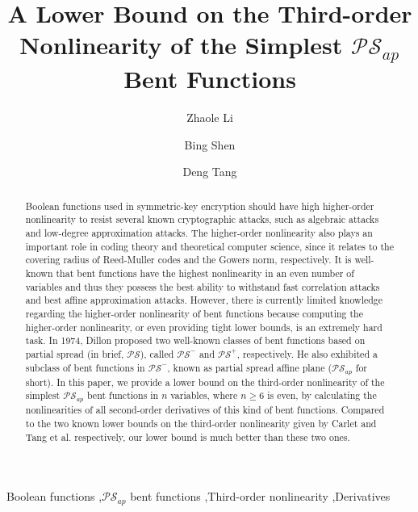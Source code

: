 \documentclass[preprint,10pt]{elsarticle}
\newcommand{\0}{\textbf{0}}
\newcommand{\1}{\textbf{1}}
\theoremstyle{plain}
\begin{document}
\begin{frontmatter}
\title{A Lower Bound on the Third-order Nonlinearity of the Simplest $\mathcal{PS}_{ap}$ Bent Functions}
\author[1]{Zhaole Li}

\author[2]{Bing Shen}

\author[1,2]{Deng Tang}

\begin{abstract}
Boolean functions used in symmetric-key encryption should have high higher-order nonlinearity to resist several known cryptographic attacks,
such as algebraic attacks and low-degree approximation attacks.
The higher-order nonlinearity also plays an important role in coding theory and theoretical computer science, since it relates to the covering radius of Reed-Muller codes and the Gowers norm, respectively.
It is well-known that bent functions have the highest nonlinearity in an even number of variables and thus they possess
the best ability to withstand fast correlation attacks and best affine approximation attacks.
However, there is currently limited knowledge regarding the higher-order nonlinearity of bent functions
because computing the higher-order nonlinearity, or even providing tight lower bounds, is an extremely hard task.
In 1974, Dillon proposed two well-known classes of bent functions based on partial spread (in brief, $\mathcal{PS}$), called
$\mathcal{PS}^-$ and $\mathcal{PS}^+$, respectively. He also exhibited a subclass of bent functions in $\mathcal{PS}^-$, known as
partial spread affine plane ($\mathcal{PS}_{ap}$ for short).
In this paper, we provide a lower bound on the third-order nonlinearity of the simplest $\mathcal{PS}_{ap}$ bent functions in $n$ variables, where $n\ge 6$ is even, by calculating the nonlinearities of all second-order derivatives of this kind of bent functions.
Compared to the two known lower bounds on the third-order nonlinearity given by Carlet and Tang et al. respectively,
our lower bound is much better than these two ones.
\end{abstract}
\begin{keyword}
    Boolean functions \sep $\mathcal{PS}_{ap}$ bent functions \sep Third-order nonlinearity \sep Derivatives
\end{keyword}            
\end{frontmatter}
\end{document}
